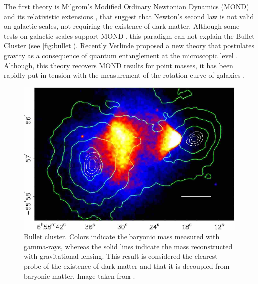 The first theory is Milgrom's Modified Ordinary Newtonian Dynamics (MOND)  and its relativistic extensions \cite{1983ApJ...270..365M,1984ApJ...286....7B,1997ApJ...480..492S,1994ApJ...429..480B}, that suggest that Newton's second law is not valid on galactic scales, not requiring the existence of dark matter. Although some tests on galactic scales support MOND \cite{2011PhRvL.106l1303M,2013PhRvL.111d1105M}, this paradigm can not explain the Bullet Cluster \cite{2006ApJ...648L.109C,2006ApJ...652..937B,2007MNRAS.382...29B} (see \autoref{fig:bullet}). Recently Verlinde proposed a new theory that postulates gravity as a consequence of quantum entanglement at the microscopic level \cite{2016arXiv161102269V}. Although, this theory recovers MOND results for point masses, it has been rapidly put in tension with the measurement of the rotation curve of galaxies \cite{2017MNRAS.468L..68L}.
\begin{figure}
\includegraphics[width=\textwidth]{./Pictures/bullet_cluster.png}
\caption{Bullet cluster. Colors indicate the baryonic mass measured with gamma-rays, whereas the solid lines indicate the mass reconstructed with gravitational lensing. This result is considered the clearest probe of the existence of dark matter and that it is decoupled from baryonic matter. Image taken from \cite{2008PhRvD..78j4004D}.}
\label{fig:bullet}
\end{figure}
\newline

